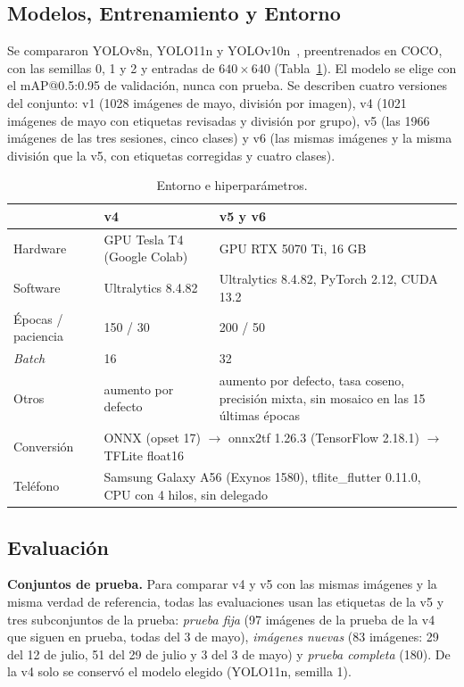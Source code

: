 \documentclass[sensors,article,submit,pdftex,moreauthors]{Definitions/mdpi}
\begin{document}
\subsection{Modelos, Entrenamiento y Entorno}

Se compararon YOLOv8n, YOLO11n y YOLOv10n~\cite{Jocher2023,Jocher2024,Wang2024v10}, preentrenados en COCO, con las semillas 0, 1 y 2 y entradas de $640\times640$ (Tabla~\ref{tab:entorno}). El modelo se elige con el mAP@0.5:0.95 de validación, nunca con prueba. Se describen cuatro versiones del conjunto: v1 (1028 imágenes de mayo, división por imagen), v4 (1021 imágenes de mayo con etiquetas revisadas y división por grupo), v5 (las 1966 imágenes de las tres sesiones, cinco clases) y v6 (las mismas imágenes y la misma división que la v5, con etiquetas corregidas y cuatro clases).

\begin{table}[H]
\caption{Entorno e hiperparámetros.\label{tab:entorno}}
\begin{tabularx}{\textwidth}{lXX}
\toprule
& \textbf{v4} & \textbf{v5 y v6}\\
\midrule
Hardware & GPU Tesla T4 (Google Colab) & GPU RTX 5070 Ti, 16 GB\\
Software & Ultralytics 8.4.82 & Ultralytics 8.4.82, PyTorch 2.12, CUDA 13.2\\
Épocas / paciencia & 150 / 30 & 200 / 50\\
\emph{Batch} & 16 & 32\\
Otros & aumento por defecto & aumento por defecto, tasa coseno, precisión mixta, sin mosaico en las 15 últimas épocas\\
\midrule
Conversión & \multicolumn{2}{p{0.72\textwidth}}{ONNX (opset 17) $\rightarrow$ onnx2tf 1.26.3 (TensorFlow 2.18.1) $\rightarrow$ TFLite float16}\\
Teléfono & \multicolumn{2}{p{0.72\textwidth}}{Samsung Galaxy A56 (Exynos 1580), tflite\_flutter 0.11.0, CPU con 4 hilos, sin delegado}\\
\bottomrule
\end{tabularx}
\end{table}

\subsection{Evaluación}

\textbf{Conjuntos de prueba.} Para comparar v4 y v5 con las mismas imágenes y la misma verdad de referencia, todas las evaluaciones usan las etiquetas de la v5 y tres subconjuntos de la prueba: \emph{prueba fija} (97 imágenes de la prueba de la v4 que siguen en prueba, todas del 3 de mayo), \emph{imágenes nuevas} (83 imágenes: 29 del 12 de julio, 51 del 29 de julio y 3 del 3 de mayo) y \emph{prueba completa} (180). De la v4 solo se conservó el modelo elegido (YOLO11n, semilla 1).
\end{document}
